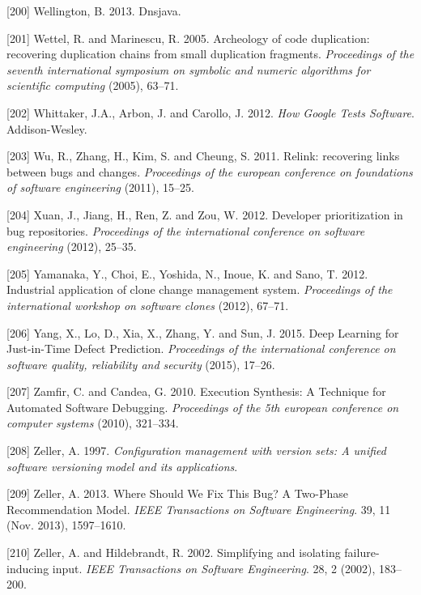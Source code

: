 \documentclass[12pt]{report}
\begin{document}
\hypertarget{ref-Wellington2013}{}
{[}200{]} Wellington, B. 2013. Dnsjava.

\hypertarget{ref-Wettel2005}{}
{[}201{]} Wettel, R. and Marinescu, R. 2005. Archeology of code
duplication: recovering duplication chains from small duplication
fragments. \emph{Proceedings of the seventh international symposium on
symbolic and numeric algorithms for scientific computing} (2005),
63--71.

\hypertarget{ref-Whittaker2012}{}
{[}202{]} Whittaker, J.A., Arbon, J. and Carollo, J. 2012. \emph{How
Google Tests Software}. Addison-Wesley.

\hypertarget{ref-Wu2011}{}
{[}203{]} Wu, R., Zhang, H., Kim, S. and Cheung, S. 2011. Relink:
recovering links between bugs and changes. \emph{Proceedings of the
european conference on foundations of software engineering} (2011),
15--25.

\hypertarget{ref-Xuan2012}{}
{[}204{]} Xuan, J., Jiang, H., Ren, Z. and Zou, W. 2012. Developer
prioritization in bug repositories. \emph{Proceedings of the
international conference on software engineering} (2012), 25--35.

\hypertarget{ref-yamanaka2012industrial}{}
{[}205{]} Yamanaka, Y., Choi, E., Yoshida, N., Inoue, K. and Sano, T.
2012. Industrial application of clone change management system.
\emph{Proceedings of the international workshop on software clones}
(2012), 67--71.

\hypertarget{ref-Yang2015}{}
{[}206{]} Yang, X., Lo, D., Xia, X., Zhang, Y. and Sun, J. 2015. Deep
Learning for Just-in-Time Defect Prediction. \emph{Proceedings of the
international conference on software quality, reliability and security}
(2015), 17--26.

\hypertarget{ref-Zamfir2010}{}
{[}207{]} Zamfir, C. and Candea, G. 2010. Execution Synthesis: A
Technique for Automated Software Debugging. \emph{Proceedings of the 5th
european conference on computer systems} (2010), 321--334.

\hypertarget{ref-Zeller1997}{}
{[}208{]} Zeller, A. 1997. \emph{Configuration management with version
sets: A unified software versioning model and its applications}.

\hypertarget{ref-Zeller2013a}{}
{[}209{]} Zeller, A. 2013. Where Should We Fix This Bug? A Two-Phase
Recommendation Model. \emph{IEEE Transactions on Software Engineering}.
39, 11 (Nov. 2013), 1597--1610.

\hypertarget{ref-Zeller2002}{}
{[}210{]} Zeller, A. and Hildebrandt, R. 2002. Simplifying and isolating
failure-inducing input. \emph{IEEE Transactions on Software
Engineering}. 28, 2 (2002), 183--200.
\end{document}

